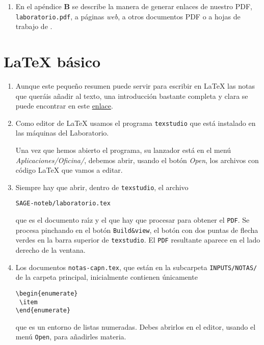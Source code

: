 \begin{appendices}
\begin{enumerate}
\item En el ap\'endice {\bf B} se describe la manera de generar enlaces de
nuestro PDF, \verb|laboratorio.pdf|, a p\'aginas {\itshape web},  a otros
documentos PDF o a hojas de trabajo de {\sage}. 










\end{enumerate}


\chapter{{\LaTeX} b\'asico}
\label{latex}

\begin{enumerate}
 
 \item Aunque este peque\~no resumen puede servir para escribir en {\LaTeX} las
notas que quer\'ais a\~nadir al texto, una introducci\'on bastante completa y
clara se puede encontrar en este 
 \href{http://150.244.21.37/PDFs/INTRO/ltxprimer-1.0.pdf}{enlace}.
 
 \item Como editor de {\LaTeX}  usamos el programa \verb|texstudio|
  que est\'a instalado en las m\'aquinas del Laboratorio. 
  
  Una vez que hemos abierto el programa, su lanzador est\'a en
el men\'u {\itshape Aplicaciones/Oficina/}, debemos abrir, usando el bot\'on
{\itshape Open}, los archivos con c\'odigo {\LaTeX} que vamos a editar.
  
  
  
  
  \item Siempre hay que abrir, dentro de \verb|texstudio|,  el archivo
\begin{center}
  \verb|SAGE-noteb/laboratorio.tex| 
 \end{center}
  
\noindent que es el documento ra\'{\i}z y el que hay que
procesar para obtener el \verb|PDF|. Se procesa pinchando en el bot\'on
\verb|Build&view|, el bot\'on con dos puntas de flecha verdes  en la barra superior de   \verb|texstudio|. El \verb|PDF| resultante aparece en el lado derecho de la ventana.  

\item Los documentos \verb|notas-capn.tex|, que est\'an en la subcarpeta
\verb|INPUTS/NOTAS/| de la carpeta principal, inicialmente contienen 
\'unicamente 
\begin{verbatim}
\begin{enumerate}
 \item 
\end{enumerate}
\end{verbatim}
\noindent que es un entorno de listas numeradas. Debes abrirlos en el editor,
usando el men\'u \verb|Open|, para a\~nadirles materia.


\end{enumerate}
\end{appendices}
